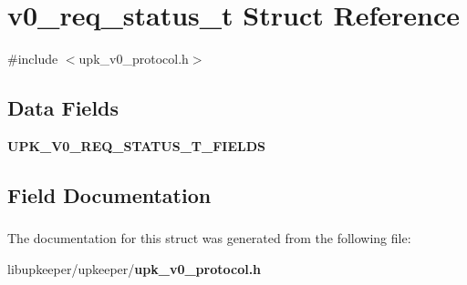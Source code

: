 \section{v0\_\-req\_\-status\_\-t Struct Reference}
\label{structv0__req__status__t}


{\ttfamily \#include $<$upk\_\-v0\_\-protocol.h$>$}

\subsection*{Data Fields}
\begin{DoxyCompactItemize}
\item 
{\bf UPK\_\-V0\_\-REQ\_\-STATUS\_\-T\_\-FIELDS}
\end{DoxyCompactItemize}


\subsection{Field Documentation}
\subsubsection[{UPK\_\-V0\_\-REQ\_\-STATUS\_\-T\_\-FIELDS}]{}\label{structv0__req__status__t_a5e646ccd5b6d1c7d28bf0642a9cdf90e}


The documentation for this struct was generated from the following file:\begin{DoxyCompactItemize}
\item 
libupkeeper/upkeeper/{\bf upk\_\-v0\_\-protocol.h}\end{DoxyCompactItemize}
